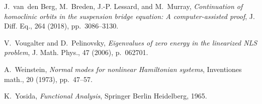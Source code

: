 \documentclass[review,onefignum,onetabnum]{siamart171218}
\begin{document}
\begin{thebibliography}{10}
{\sc J.~van~den Berg, M.~Breden, J.-P. Lessard, and M.~Murray}, {\em
  Continuation of homoclinic orbits in the suspension bridge equation: A
  computer-assisted proof}, J. Diff. Eq., 264 (2018), pp.~3086--3130.

{\sc V.~Vougalter and D.~Pelinovsky}, {\em Eigenvalues of zero energy in the
  linearized {NLS} problem}, J. Math. Phys., 47 (2006), p.~062701.

{\sc A.~Weinstein}, {\em Normal modes for nonlinear {H}amiltonian systems},
  Inventiones math., 20 (1973), pp.~47--57.
  
{\sc K.~Yosida}, {\em Functional Analysis}, Springer Berlin Heidelberg, 1965.

\end{thebibliography}

\end{document}
